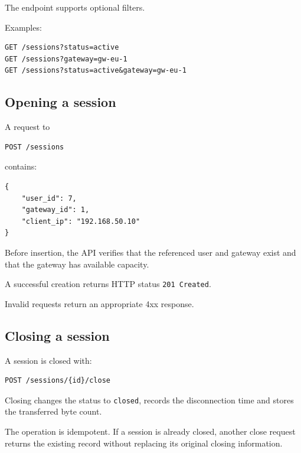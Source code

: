 \documentclass[11pt,a4paper]{article}
\begin{document}
The endpoint supports optional filters.

Examples:

\begin{verbatim}
GET /sessions?status=active
GET /sessions?gateway=gw-eu-1
GET /sessions?status=active&gateway=gw-eu-1
\end{verbatim}

\subsection{Opening a session}

A request to

\begin{verbatim}
POST /sessions
\end{verbatim}

contains:

\begin{verbatim}
{
    "user_id": 7,
    "gateway_id": 1,
    "client_ip": "192.168.50.10"
}
\end{verbatim}

Before insertion, the API verifies that the referenced user and gateway exist
and that the gateway has available capacity.

A successful creation returns HTTP status \texttt{201 Created}.

Invalid requests return an appropriate 4xx response.

\subsection{Closing a session}

A session is closed with:

\begin{verbatim}
POST /sessions/{id}/close
\end{verbatim}

Closing changes the status to \texttt{closed}, records the disconnection time
and stores the transferred byte count.

The operation is idempotent. If a session is already closed, another close
request returns the existing record without replacing its original closing
information.

\end{document}
